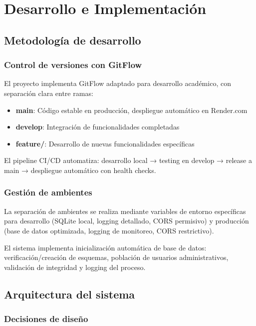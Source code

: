 \chapter{Desarrollo e Implementación}
\label{ch:desarrollo}

\section{Metodología de desarrollo}

\subsection{Control de versiones con GitFlow}

El proyecto implementa GitFlow adaptado para desarrollo académico, con separación clara entre ramas:

\begin{itemize}
    \item \textbf{main}: Código estable en producción, despliegue automático en Render.com
    \item \textbf{develop}: Integración de funcionalidades completadas
    \item \textbf{feature/}: Desarrollo de nuevas funcionalidades específicas
\end{itemize}

El pipeline CI/CD automatiza: desarrollo local → testing en develop → release a main → despliegue automático con health checks.

\subsection{Gestión de ambientes}

La separación de ambientes se realiza mediante variables de entorno específicas para desarrollo (SQLite local, logging detallado, CORS permisivo) y producción (base de datos optimizada, logging de monitoreo, CORS restrictivo).

El sistema implementa inicialización automática de base de datos: verificación/creación de esquemas, población de usuarios administrativos, validación de integridad y logging del proceso.

\section{Arquitectura del sistema}

\subsection{Decisiones de diseño}


